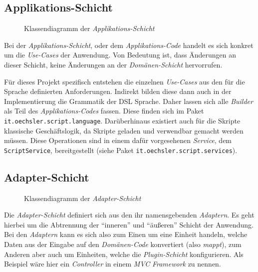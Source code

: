 \subsection{Applikations-Schicht}
\label{subsec:appliktions_schicht}

\begin{sidewaysfigure}
    \centering


    \caption{Klassendiagramm der \emph{Applikations-Schicht}}
    \label{fig:application}
\end{sidewaysfigure}

Bei der \emph{Applikations-Schicht}, oder dem \emph{Applikations-Code} handelt es sich konkret um die \emph{Use-Cases} der Anwendung.
Von Bedeutung ist, dass Änderungen an dieser Schicht, keine Änderungen an der \emph{Domänen-Schicht} hervorrufen.

Für dieses Projekt spezifisch entstehen die einzelnen \emph{Use-Cases} aus den für die Sprache definierten Anforderungen. 
Indirekt bilden diese dann auch in der Implementierung die Grammatik der DSL Sprache.
Daher lassen sich alle \emph{Builder} als Teil des \emph{Applikations-Codes} fassen.
Diese finden sich im Paket \texttt{it.oechsler.script.language}.
Darüberhinaus existiert auch für die Skripte klassische Geschäftslogik, da Skripte geladen und verwendbar gemacht werden müssen.
Diese Operationen sind in einem dafür vorgesehenen \emph{Service}, dem \texttt{ScriptService}, bereitgestellt (siehe Paket \texttt{it.oechsler.script.services}).

\subsection{Adapter-Schicht}
\label{subsec:adapter_schicht}

\begin{figure}[H]
    \centering


    \caption{Klassendiagramm der \emph{Adapter-Schicht}}
    \label{fig:adapter}
\end{figure}

Die \emph{Adapter-Schicht} definiert sich aus den ihr namensgebenden \emph{Adaptern}.
Es geht hierbei um die Abtrennung der \enquote{inneren} und \enquote{äußeren} Schicht der Anwendung.
Bei den \emph{Adaptern} kann es sich also zum Einen um eine Einheit handeln, welche Daten aus der Eingabe auf den \emph{Domänen-Code} konvertiert (also \emph{mappt}), zum Anderen aber auch um Einheiten, welche die \emph{Plugin-Schicht} konfigurieren. 
Als Beispiel wäre hier ein \emph{Controller} in einem \emph{MVC} \emph{Framework} zu nennen.

